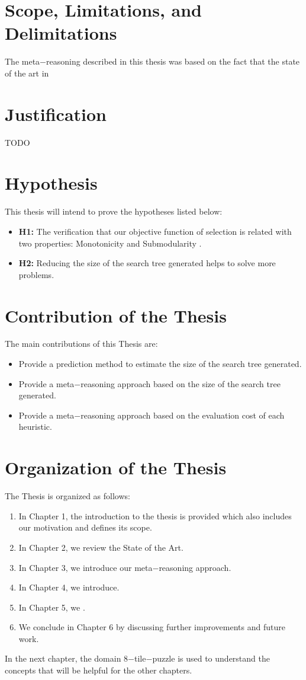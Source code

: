 \section{Scope, Limitations, and Delimitations}
\noindent
The meta$-$reasoning described in this thesis was based on the fact that the state of the art in 
\section{Justification}
\noindent
TODO
\section{Hypothesis}
\noindent
This thesis will intend to prove the hypotheses listed below:
\begin{itemize}
\item \textbf{H1:} The verification that our objective function of selection is related with two properties: Monotonicity and Submodularity .
\item \textbf{H2:} Reducing the size of the search tree generated helps to solve more problems.
\end{itemize}

\section{Contribution of the Thesis}
\noindent
The main contributions of this Thesis are:
\begin{itemize}
\item Provide a prediction method to estimate the size of the search tree generated.
\item Provide a meta$-$reasoning approach based on the size of the search tree generated.
\item Provide a meta$-$reasoning approach based on the evaluation cost of each heuristic. 
\end{itemize}

\section{Organization of the Thesis}
\noindent
The Thesis is organized as follows: 
\begin{enumerate}
\item In Chapter 1, the introduction to the thesis is provided which also includes our motivation and defines its scope. 
\item In Chapter 2, we review the State of the Art.
\item In Chapter 3, we introduce our meta$-$reasoning approach. 
\item In Chapter 4, we introduce. 
\item In Chapter 5, we .
\item We conclude in Chapter 6 by discussing further improvements and future work.
\end{enumerate}

In the next chapter, the domain 8$-$tile$-$puzzle is used to understand the concepts that will be helpful for the other chapters. \\

\clearpage